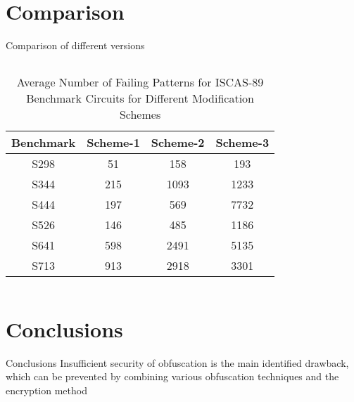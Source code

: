\documentclass{beamer}
\begin{document}
\section{Comparison}
\begin{frame}{Comparison of different versions}

\begin{columns}
    \begin{column}{1\textwidth}
        \begin{table}[t]
        \caption{Average Number of Failing Patterns for ISCAS-89 Benchmark Circuits for Different Modification Schemes}
        \centering
        \begin{tabular}{|c|c|c|c|}
            \hline
            Benchmark & Scheme-1 & Scheme-2 & Scheme-3 \\\hline
            S298 & 51 & 158 & 193 \\\hline
            S344 & 215 & 1093 & 1233 \\\hline
            S444 & 197 & 569 & 7732 \\\hline
            S526 & 146 & 485 & 1186 \\\hline
            S641 & 598 & 2491 & 5135 \\\hline
            S713 & 913 & 2918 & 3301 \\\hline
        \end{tabular}
\end{table}
\end{column}
\end{columns}

\end{frame}

\section{Conclusions}
\begin{frame}{Conclusions}
     Insufficient security of obfuscation is the main identified drawback, which can be prevented by combining various obfuscation techniques and the encryption method
\end{frame}

\begin{frame}
    \tableofcontents
\end{frame}
\end{document}
